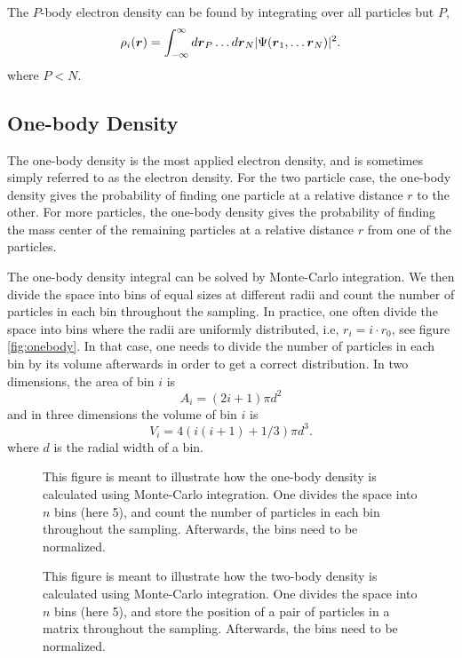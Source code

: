 The $P$-body electron density can be found by integrating over all particles but $P$, 
\begin{equation}
\label{eq:electron_density}
\rho_i(\boldsymbol{{r}})=\int_{-\infty}^{\infty}d\boldsymbol{{r}}_P\hdots d\boldsymbol{{r}}_N |\Psi(\boldsymbol{{r}}_1,\hdots \boldsymbol{{r}}_N)|^2.
\end{equation}
where $P<N$.

\subsection{One-body Density}
The one-body density is the most applied electron density, and is sometimes simply referred to as the electron density. For the two particle case, the one-body density gives the probability of finding one particle at a relative distance $r$ to the other. For more particles, the one-body density gives the probability of finding the mass center of the remaining particles at a relative distance $r$ from one of the particles.

The one-body density integral can be solved by Monte-Carlo integration. We then divide the space into bins of equal sizes at different radii and count the number of particles in each bin throughout the sampling. In practice, one often divide the space into bins where the radii are uniformly distributed, i.e, $r_i=i\cdot r_0$, see figure \eqref{fig:onebody}. In that case, one needs to divide the number of particles in each bin by its volume afterwards in order to get a correct distribution. In two dimensions, the area of bin $i$ is
\begin{equation}
A_i=(2i+1)\pi d^2
\end{equation}
and in three dimensions the volume of bin $i$ is
\begin{equation}
V_i=4(i(i+1)+1/3)\pi d^3.
\end{equation}
where $d$ is the radial width of a bin. 

\begin{figure}
	\centering
	\label{fig:onebody}
	
	\caption{This figure is meant to illustrate how the one-body density is calculated using Monte-Carlo integration. One divides the space into $n$ bins (here 5), and count the number of particles in each bin throughout the sampling. Afterwards, the bins need to be normalized.}
\end{figure}

\begin{figure}
	\centering
	\label{fig:twobody}
	
	\caption{This figure is meant to illustrate how the two-body density is calculated using Monte-Carlo integration. One divides the space into $n$ bins (here 5), and store the position of a pair of particles in a matrix throughout the sampling. Afterwards, the bins need to be normalized.}
\end{figure}

